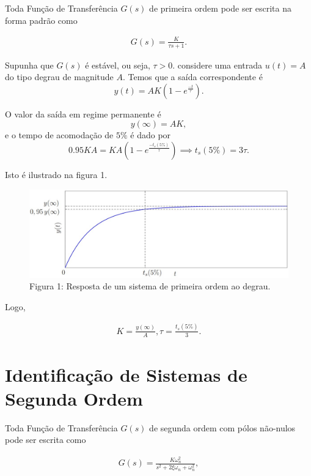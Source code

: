 \documentclass[
]{book}
\theoremstyle{definition}
\theoremstyle{definition}
\theoremstyle{definition}
\theoremstyle{remark}
\begin{document}
Toda Função de Transferência \(G(s)\) de primeira ordem pode ser escrita na forma padrão como

\begin{align}
G(s) = \frac{K}{\tau s+1}. \label{eq:eq31}
\end{align}

Supunha que \(G(s)\) é estável, ou seja, \(\tau > 0\). considere uma entrada \(u(t) = A\) do tipo degrau de magnitude \(A\). Temos que a saída correspondente é
\[
y(t) = AK(1- e^{\frac {-t}{\tau}}).
\]

O valor da saída em regime permanente é
\[
y(\infty) = AK,
\]
e o tempo de acomodação de \(5\%\) é dado por
\[
0.95KA = KA(1- e^{\frac {-t_s(5\%)}{\tau}}) \implies t_s(5\%) =3 \tau.
\]

Isto é ilustrado na figura 1.

\begin{figure}
\centering
\includegraphics{Imagens/Lab3/Explicação/fig1.jpg}
\caption{Figura 1: Resposta de um sistema de primeira ordem ao degrau.}
\end{figure}

Logo,

\begin{align}
K = \frac{y(\infty)}{A},  \tau = \frac {t_s(5\%)}{3}. \label{eq:eq32}
\end{align}

\hypertarget{identificauxe7uxe3o-de-sistemas-de-segunda-ordem}{%
\section{Identificação de Sistemas de Segunda Ordem}\label{identificauxe7uxe3o-de-sistemas-de-segunda-ordem}}

Toda Função de Transferência \(G(s)\) de segunda ordem com pólos não-nulos pode ser escrita como

\begin{align}
G(s) = \frac {K \omega_n^2}{s^2+2\xi \omega_n+ \omega_n^2}, \label{eq:eq33}
\end{align}
\end{document}
